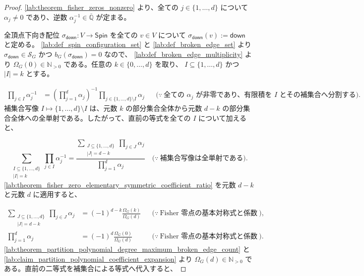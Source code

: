 \documentclass[11pt,a4paper]{article}
\theoremstyle{remark}
\begin{document}
\begin{proof}
\cref{lab:theorem_fisher_zeros_nonzero}
 より、全ての 
$j\in\{1,\ldots,d\}$
 について 
$\alpha_j\ne0$
 であり、逆数 
$\alpha_j^{-1}\in\overline{\mathbb Q}$
 が定まる。

全頂点下向き配位 
$\sigma_{\mathsf{down}}:V\to\mathsf{Spin}$
 を全ての 
$v\in V$
 について 
$\sigma_{\mathsf{down}}(v):=\mathsf{down}$
 と定める。
\cref{lab:def_spin_configuration_set}
 と 
\cref{lab:def_broken_edge_set}
 より 
$\sigma_{\mathsf{down}}\in\mathcal S_G$
 かつ 
$b_G(\sigma_{\mathsf{down}})=0$
 なので、
\cref{lab:def_broken_edge_multiplicity}
 より 
$\Omega_G(0)\in\mathbb N_{>0}$
 である。任意の 
$k\in\{0,\ldots,d\}$
 を取り、
$I\subseteq\{1,\ldots,d\}$
 かつ 
$|I|=k$
 とする。

\[\begin{aligned}
\prod_{j\in I}\alpha_j^{-1}
&=
\left(
  \prod_{j=1}^{d}\alpha_j
\right)^{-1}
\prod_{j\in\{1,\ldots,d\}\setminus I}\alpha_j
&&\bigl(\because\ \text{全ての }\alpha_j\text{ が非零であり、有限積を }I\text{ とその補集合へ分割する}\bigr).
\end{aligned}\]
補集合写像 
$I\mapsto\{1,\ldots,d\}\setminus I$
 は、元数 
$k$
 の部分集合全体から元数 
$d-k$
 の部分集合全体への全単射である。したがって、直前の等式を全ての 
$I$
 について加えると、

\[\sum_{\substack{I\subseteq\{1,\ldots,d\}\\|I|=k}}
\prod_{j\in I}\alpha_j^{-1}
=
\frac{
  \displaystyle
  \sum_{\substack{J\subseteq\{1,\ldots,d\}\\|J|=d-k}}
  \prod_{j\in J}\alpha_j
}{
  \displaystyle
  \prod_{j=1}^{d}\alpha_j
}
\quad\bigl(\because\ \text{補集合写像は全単射である}\bigr).\]
\cref{lab:theorem_fisher_zero_elementary_symmetric_coefficient_ratio}
 を元数 
$d-k$
 と元数 
$d$
 に適用すると、

\[\begin{aligned}
\sum_{\substack{J\subseteq\{1,\ldots,d\}\\|J|=d-k}}
\prod_{j\in J}\alpha_j
&=
(-1)^{d-k}\frac{\Omega_G(k)}{\Omega_G(d)}
&&\bigl(\because\ \text{Fisher 零点の基本対称式と係数比}\bigr),\\
\prod_{j=1}^{d}\alpha_j
&=
(-1)^d\frac{\Omega_G(0)}{\Omega_G(d)}
&&\bigl(\because\ \text{Fisher 零点の基本対称式と係数比}\bigr).
\end{aligned}\]
\cref{lab:theorem_partition_polynomial_degree_maximum_broken_edge_count}
 と 
\cref{lab:claim_partition_polynomial_coefficient_expansion}
 より 
$\Omega_G(d)\in\mathbb N_{>0}$
 である。直前の二等式を補集合による等式へ代入すると、


\end{proof}
\end{document}
